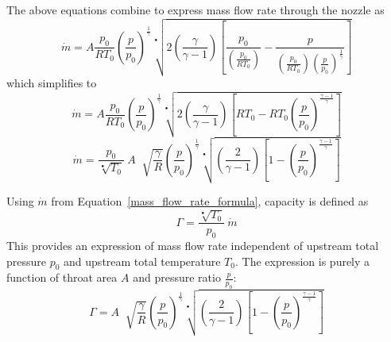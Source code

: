 \documentclass[a4paper, 11pt, oneside]{report}
\begin{document}
The above equations combine to express mass flow rate through the nozzle as
\begin{equation}
\dot{m} =
A
\frac{p_0}{R T_0}
\left(\frac{p}{p_0}\right)^\frac{1}{\gamma}
\sqrt[•]{ 
2 \left( \frac{\gamma}{\gamma - 1} \right) 
\left[ \frac{p_0}{ \left( \frac{p_0}{R T_0} \right) } - \frac{p}{ \left( \frac{p_0}{R T_0} \right) \left(\frac{p}{p_0}\right)^\frac{1}{\gamma} } \right] 
}
\end{equation}
which simplifies to
\begin{equation}
\dot{m} =
A
\frac{p_0}{R T_0}
\left(\frac{p}{p_0}\right)^\frac{1}{\gamma}
\sqrt[•]{
	2 \left( 
		\frac{\gamma}{\gamma - 1} 
	\right)
	\left[ 
		R T_0 - R T_0 \left( \frac{p}{p_0} \right)^\frac{\gamma-1}{\gamma} 
	\right]
}
\end{equation}
\begin{equation}\label{mass_flow_rate_formula}
\dot{m} =
\frac{p_0}{\sqrt[•]{T_0}} \>
A \;
\sqrt[]{\frac{\gamma}{R}}
\left(
    \frac{p}{p_0}
\right)^\frac{1}{\gamma}
\sqrt[•]{
	\left(
		\frac{2}{\gamma - 1}  
	\right)
	\left[
		1 - \left( \frac{p}{p_0} \right)^\frac{\gamma-1}{\gamma}
	\right] 
}
\end{equation}

Using $\dot{m}$ from Equation~\ref{mass_flow_rate_formula}, capacity is defined as
\begin{equation}\label{capacity_definition}
\Gamma = \frac{\sqrt[•]{T_0}}{p_0}  \>
\dot{m}
\end{equation}
This provides an expression of mass flow rate independent of upstream total pressure $p_0$ and upstream total temperature $T_0$. The expression is purely a function of throat area $A$ and pressure ratio $\frac{p}{p_0}$:
\begin{equation}
\Gamma =
A \;
\sqrt[]{\frac{\gamma}{R}}
\left(
    \frac{p}{p_0}
\right)^\frac{1}{\gamma}
\sqrt[•]{
	\left(
		\frac{2}{\gamma - 1}  
	\right)
	\left[
		1 - \left( \frac{p}{p_0} \right)^\frac{\gamma-1}{\gamma}
	\right] 
}
\end{equation}
\end{document}
